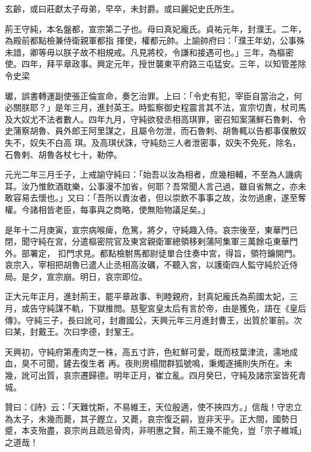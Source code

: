 \begin{pinyinscope}
 玄齡，或曰莊獻太子母弟，早卒，未封爵。或曰麗妃史氏所生。



 荊王守純，本名盤都，宣宗第二子也。母曰真妃龐氏。貞祐元年，封濮王。二年，為殿前都點檢兼侍衛親軍都指
 揮使，權都元帥。上諭帥府曰：「濮王年幼，公事殊未諳，卿等毋以朕子故不相規戒。凡見將校，令謙和接遇可也。」三年，為樞密使。四年，拜平章政事。興定元年，授世襲東平府路三屯猛安。三年，以知管差除令史梁



 瓛，誤書轉運副使張正倫宣命，奏乞治罪。上曰：「令史有犯，宰臣自當治之，何必關朕耶？」是年三月，進封英王。時監察御史程震言其不法，宣宗切責，杖司馬及大奴尤不法者數人。四年九月，守純欲發丞相高琪罪，密召知案蒲鮮石魯剌、令史蒲察胡魯、員外郎王阿里謀之，且屬令勿泄，而石魯剌、胡魯輒以告都事僕散奴失不，奴失不白高
 琪。及高琪伏誅，守純劾三人者泄密事，奴失不免死，除名，石魯剌、胡魯各杖七十，勒停。



 元光二年三月壬子，上戒諭守純曰：「始吾以汝為相者，庶幾相輔，不至為人譏病耳。汝乃惟飲酒耽樂，公事漫不加省，何耶？吾常聞人言己過，雖自省無之，亦未敢容易去懷也。」又曰：「吾所以責汝者，但以崇飲不事事之故，汝勿過慮，遂至奪權。今諸相皆老臣，每事與之商略，使無貽物議足矣。」



 是年十二月庚寅，宣宗病喉痺，危篤，將夕，守純趣入侍。哀宗後至，東華門已閉，聞守純在宮，分遣樞密院官及東宮親衛軍總領移剌蒲阿集軍三萬餘屯東華門外。部署定，
 扣門求見。都點檢駙馬都尉徒單合住奏中宮，得旨，領符鑰開門。哀宗入，宰相把胡魯已遣人止丞相高汝礪，不聽入宮，以護衛四人監守純於近侍局。是夕，宣宗崩。明日，哀宗即位。



 正大元年正月，進封荊王，罷平章政事、判睦親府，封真妃龐氏為荊國太妃，三月，或告守純謀不軌，下獄推問。慈聖宮皇太后有言於帝，由是獲免，語在《皇后傳》。守純三子，長曰訛可，封肅國公，天興元年三月進封曹王，出質於軍前。次曰某，封戴王。次曰孛德，封鞏王。



 天興初，守純府第產肉芝一株，高五寸許，色紅鮮可愛，既而枝葉津流，濡地成血，臭不可聞，鏟去復生者
 再。夜則房榻間群狐號鳴，秉燭逐捕則失所在。未幾，訛可出質，哀宗遷歸德。明年正月，崔立亂。四月癸巳，守純及諸宗室皆死青城。



 贊曰：《詩》云：「天難忱斯，不易維王，天位殷適，使不挾四方。」信哉！守忠立為太子，未幾而薨，其子鏗立，又薨，哀宗復乏嗣，豈非天乎。正大間，國勢日蹙，本支殆盡，哀宗尚且疏忌骨肉，非明惠之賢，荊王幾不能免，豈「宗子維城」之道哉！




\end{pinyinscope}
